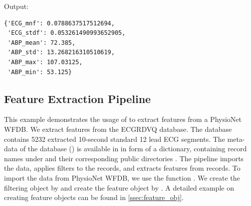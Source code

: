 \documentclass{article}
\begin{document}
Output:
\begin{lstlisting}
{'ECG_mnf': 0.0788637517512694,
 'ECG_stdf': 0.053261490993652905,
 'ABP_mean': 72.385,
 'ABP_std': 13.268216310510619,
 'ABP_max': 107.03125,
 'ABP_min': 53.125}
\end{lstlisting}

\subsection{Feature Extraction Pipeline}
This example demonstrates the usage of  to extract features from a PhysioNet WFDB.
We extract features from the ECGRDVQ database. The database contains 5232 extracted 10-second standard 12 lead ECG segments. The meta-data of the database () is available in  in form of a dictionary, containing record names under  and  their corresponding public directories . The pipeline imports the data, applies filters to the records, and extracts features from records. To import the data from PhysioNet WFDB, we use the function . We create the filtering object by  and create the feature object by . A detailed example on creating feature objects can be found in \ref{ssec:feature_obj}.
\end{document}
